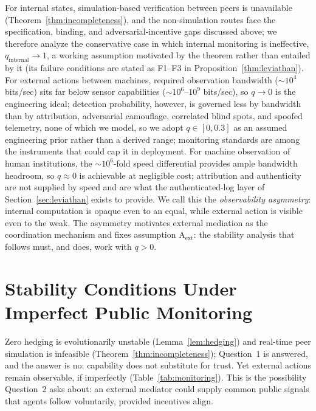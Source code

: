 \documentclass[manuscript,screen,review]{jair}
\begin{document}
For internal states, simulation-based verification between peers is unavailable (Theorem~\ref{thm:incompleteness}), and the non-simulation routes face the specification, binding, and adversarial-incentive gaps discussed above; we therefore analyze the conservative case in which internal monitoring is ineffective, $q_{\mathrm{internal}} \to 1$, a working assumption motivated by the theorem rather than entailed by it (its failure conditions are stated as F1--F3 in Proposition~\ref{thm:leviathan}). For external actions between machines, required observation bandwidth (${\sim}10^4$ bits/sec) sits far below sensor capabilities (${\sim}10^6$--$10^9$ bits/sec), so $q \to 0$ is the engineering ideal; detection probability, however, is governed less by bandwidth than by attribution, adversarial camouflage, correlated blind spots, and spoofed telemetry, none of which we model, so we adopt $q \in [0, 0.3]$ as an assumed engineering prior rather than a derived range; monitoring standards are among the instruments that could cap it in deployment. For machine observation of human institutions, the ${\sim}10^6$-fold speed differential provides ample bandwidth headroom, so $q \approx 0$ is achievable at negligible cost; attribution and authenticity are not supplied by speed and are what the authenticated-log layer of Section~\ref{sec:leviathan} exists to provide. We call this the \emph{observability asymmetry}: internal computation is opaque even to an equal, while external action is visible even to the weak. The asymmetry motivates external mediation as the coordination mechanism and fixes assumption A$_{\mathrm{ext}}$: the stability analysis that follows must, and does, work with $q > 0$.

\section{Stability Conditions Under Imperfect Public Monitoring}
\label{sec:stability}

Zero hedging is evolutionarily unstable (Lemma~\ref{lem:hedging}) and real-time peer simulation is infeasible (Theorem~\ref{thm:incompleteness}); Question~1 is answered, and the answer is no: capability does not substitute for trust. Yet external actions remain observable, if imperfectly (Table~\ref{tab:monitoring}). This is the possibility Question~2 asks about: an external mediator could supply common public signals that agents follow voluntarily, provided incentives align.
\end{document}
